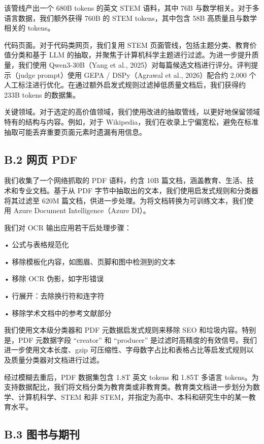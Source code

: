 该管线产出一个 680B tokens 的英文 STEM 语料，其中 76B 与数学相关。对于多语言数据，我们额外获得 760B 的 STEM tokens，其中包含 58B 高质量且与数学相关的 tokens。

代码页面。对于代码类网页，我们复用 STEM 页面管线，包括主题分类、教育价值分类和基于 LLM 的抽取，并聚焦于计算机科学主题进行过滤。为进一步提升质量，我们使用 Qwen3-30B（Yang et al., 2025）对每篇候选文档进行评分。评判提示（judge prompt）使用 GEPA / DSPy（Agrawal et al., 2026）配合约 2,000 个人工标注进行优化。在通过额外启发式规则过滤掉低质量文档后，我们获得约 233B tokens 的数据集。

关键领域。对于选定的高价值领域，我们使用改进的抽取管线，以更好地保留领域特有的结构与内容。例如，对于 Wikipedia，我们在收录上宁偏宽松，避免在标准抽取可能丢弃重要页面元素时遗漏有用信息。

\subsection{B.2 网页 PDF}\label{b.2-web-pdfs}

我们收集了一个网络抓取的 PDF 语料，约含 10B 篇文档，涵盖教育、生活、技术和专业文档。基于从 PDF 字节中抽取出的文本，我们使用启发式规则和分类器将其过滤至 620M 篇文档，供进一步处理。为将文档转换为可训练文本，我们使用 Azure Document Intelligence（Azure DI）。

我们对 OCR 输出应用若干后处理步骤：

• 公式与表格规范化

• 移除模板化内容，如图眉、页脚和图中检测到的文本

• 移除 OCR 伪影，如字形错误

• 行展开：去除换行符和连字符

• 移除学术文档中的参考文献部分

我们使用文本级分类器和 PDF 元数据启发式规则来移除 SEO 和垃圾内容。特别是，PDF 元数据字段 ``creator'' 和 ``producer'' 是过滤时高精度的有效信号。我们进一步使用文本长度、gzip 可压缩性、字母数字占比和表格占比等启发式规则以及质量分类器对文档进行过滤。

经过模糊去重后，PDF 数据集包含 1.8T 英文 tokens 和 1.85T 多语言 tokens。为支持数据配比，我们将文档分类为教育类或非教育类。教育类文档进一步划分为数学、计算机科学、STEM 和非 STEM，并指定为高中、本科和研究生中的某一教育水平。

\subsection{B.3 图书与期刊}\label{b.3-books-and-journals}

